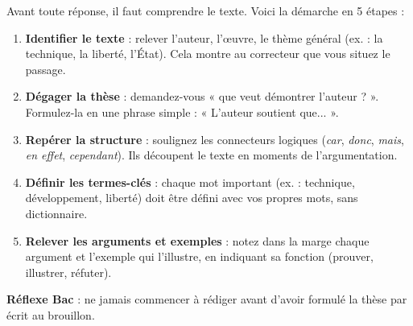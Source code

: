 \documentclass[11pt]{article}
\newcommand{\cle}[1]{{\popxbold\color{popdark}#1}}
\begin{document}
\begin{methode}
Avant toute réponse, il faut comprendre le texte. Voici la démarche en 5 étapes :
\begin{enumerate}
\item \textbf{Identifier le texte} : relever l'auteur, l'œuvre, le thème général (ex. : la technique, la liberté, l'État). Cela montre au correcteur que vous situez le passage.
\item \textbf{Dégager la thèse} : demandez-vous « que veut démontrer l'auteur ? ». Formulez-la en une phrase simple : « L'auteur soutient que... ».
\item \textbf{Repérer la structure} : soulignez les connecteurs logiques (\emph{car}, \emph{donc}, \emph{mais}, \emph{en effet}, \emph{cependant}). Ils découpent le texte en moments de l'argumentation.
\item \textbf{Définir les termes-clés} : chaque mot important (ex. : \cle{technique}, \cle{développement}, \cle{liberté}) doit être défini avec vos propres mots, sans dictionnaire.
\item \textbf{Relever les arguments et exemples} : notez dans la marge chaque argument et l'exemple qui l'illustre, en indiquant sa fonction (prouver, illustrer, réfuter).
\end{enumerate}
\textbf{Réflexe Bac} : ne jamais commencer à rédiger avant d'avoir formulé la thèse par écrit au brouillon.
\end{methode}
\end{document}
